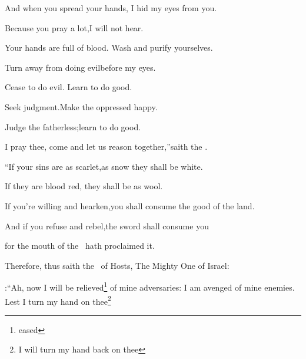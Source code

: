 
\begin{inparaenum}
  
  \pb {} And when you spread your hands,%
  \pa I hid my eyes from you.%
  
  \pc Because you pray a lot,\pa I will not hear.%
  
  \pc Your hands are full of blood.\pa {} Wash and purify yourselves.%
  
  \pc Turn away from doing evil\pa before my eyes.%
  
  \pc Cease to do evil.\pa {} Learn to do good.%
  
  \pc Seek judgment.\pa Make the oppressed happy.%
  
  \pc Judge the fatherless;\pa learn to do good.%
  
  \pb {} I pray thee, come and let us reason together,''\pa saith the \lord.%

  \pc ``If your sins are as scarlet,\pa as snow they shall be white.%

  \pc If they are blood red,%
  \pa they shall be as wool.%
  
  \pb {} If you're willing and hearken,\pa you shall consume the good of the land.%
  
  \pb {} And if you refuse and rebel,\pa the sword shall consume you%
  
  \pc for the mouth of the \lord\ hath proclaimed it.%
  
   Therefore, thus saith the \lord\ of Hosts, The Mighty One of Israel:\smallskip%

:``Ah, now I will be relieved\footnote{eased} of mine adversaries: I am avenged of mine enemies.%
   Lest I turn my hand on thee\footnote{I will turn my hand back on thee}%


\end{inparaenum}
